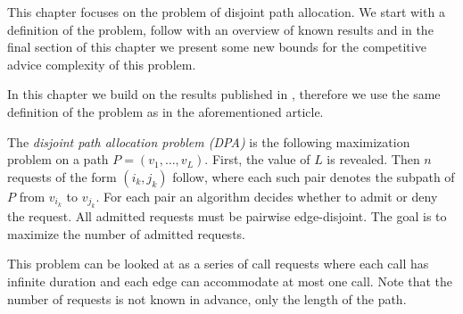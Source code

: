 This chapter focuses on the problem of disjoint path allocation. We start
with a definition of the problem, follow with an overview of known results
and in the final section of this chapter we present some new bounds for
the competitive advice complexity of this problem.


In this chapter we build on the results published in \cite{sofsem2014},
therefore we use the same definition of the problem as in the
aforementioned article.

\begin{definition}
    The \emph{disjoint path allocation problem (DPA)} is the following
    maximization problem on a path $P = (v_1, \dots, v_L)$. First, the
    value of $L$ is revealed. Then $n$ requests of the form $(i_k, j_k)$
    follow, where each such pair denotes the subpath of $P$ from $v_{i_k}$
    to $v_{j_k}$. For each pair an algorithm decides whether to admit or
    deny the request. All admitted requests must be pairwise
    edge-disjoint. The goal is to maximize the number of admitted
    requests.
\end{definition}

This problem can be looked at as a series of call requests where each call
has infinite duration and each edge can accommodate at most one call. Note
that the number of requests is not known in advance, only the length of
the path.
